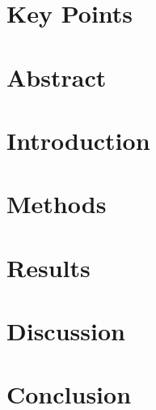 \documentclass{article}
\begin{document}
\maketitle

\pagebreak

\section{Key Points} \label{sec:keypoints}

\section{Abstract} \label{sec:abstract}

\pagebreak

\section{Introduction} \label{sec:intro}

\pagebreak

\section{Methods} \label{sec:methods}

\pagebreak

\section{Results} \label{sec:results}

\pagebreak

\section{Discussion} \label{sec:discussion}

\pagebreak

\section{Conclusion} \label{sec:conclusion}




\pagebreak


\end{document}
